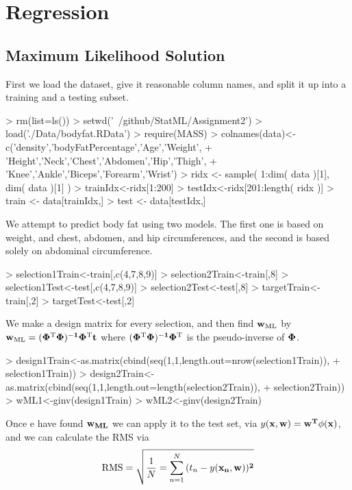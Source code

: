 \documentclass[nogin, 10pt]{article}
\begin{document}
\section{Regression}
\subsection{Maximum Likelihood Solution}
First we load the dataset, give it reasonable column names, and split it up into a training and a testing subset.
\begin{Schunk}
\begin{Sinput}
> rm(list=ls())
> setwd('~/github/StatML/Assignment2')
> load('./Data/bodyfat.RData')
> require(MASS)
> colnames(data)<-c('density','bodyFatPercentage','Age','Weight',
+                   'Height','Neck','Chest','Abdomen','Hip','Thigh',
+                   'Knee','Ankle','Biceps','Forearm','Wrist')
> ridx <- sample( 1:dim( data )[1], dim( data )[1] )
> trainIdx<-ridx[1:200]
> testIdx<-ridx[201:length( ridx )]
> train <- data[trainIdx,]
> test <- data[testIdx,]
\end{Sinput}
\end{Schunk}
We attempt to predict body fat using two models. The first one is based on weight, and chest, abdomen, and hip circumferences, and the second is based solely on abdominal circumference.
\begin{Schunk}
\begin{Sinput}
> selection1Train<-train[,c(4,7,8,9)]
> selection2Train<-train[,8]
> selection1Test<-test[,c(4,7,8,9)]
> selection2Test<-test[,8]
> targetTrain<-train[,2]
> targetTest<-test[,2]
\end{Sinput}
\end{Schunk}
We make a design matrix for every selection, and then find $\bf{w}_{\text{ML}}$ by $\bf{w}_{\text{ML}}=(\bf{\Phi}^{\text{T}}\bf{\Phi})^{-1}\bf{\Phi}^{\text{T}}\bf{t}$ where $(\bf{\Phi}^{\text{T}}\bf{\Phi})^{-1}\bf{\Phi}^{\text{T}}$ is the pseudo-inverse of $\bf{\Phi}$.
\begin{Schunk}
\begin{Sinput}
> design1Train<-as.matrix(cbind(seq(1,1,length.out=nrow(selection1Train)),
+                          selection1Train))
> design2Train<-as.matrix(cbind(seq(1,1,length.out=length(selection2Train)),
+                          selection2Train))
> wML1<-ginv(design1Train)%
> wML2<-ginv(design2Train)%
\end{Sinput}
\end{Schunk}
Once e have found $\bf{w}_{ML}$ we can apply it to the test set, via $y(\bf{x},\bf{w})=\bf{w}^{\bf{T}}\phi(\bf{x})$, and we can calculate the RMS via \[
\text{RMS}=\sqrt{\frac{1}{N}=\sum^N_{n=1}{(t_n-y(\bf{x}_n,\bf{w}))^2}}
\]
\end{document}

